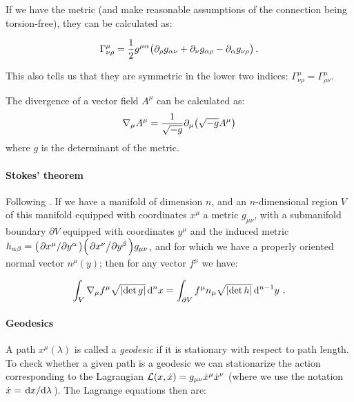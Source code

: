 \documentclass[main.tex]{subfiles}
\begin{document}
If we have the metric (and make reasonable assumptions of the connection being torsion-free), they can be calculated as:

\begin{equation}  \label{eq:christoffel-symbols-from-metric}
    \Gamma^\mu_{\nu \rho} = \frac{1}{2} g^{\mu \alpha} \qty(
    \partial_\rho g_{\alpha \nu} +
    \partial_\nu g_{\alpha \rho} -
    \partial_\alpha g_{\nu \rho}
    )\,.
\end{equation}

This also tells us that they are symmetric in the lower two indices: $\Gamma ^\mu _{\nu \rho} = \Gamma ^\mu _{\rho \nu}$.

The divergence of a vector field $A^\mu$ can be calculated as:
\begin{equation}
    \nabla_\mu A^\mu = \frac{1}{\sqrt{-g}}\partial_\mu \qty(\sqrt{-g}A^\mu) \label{eq:covariant-divergence}
\end{equation}
where $g$ is the determinant of the metric.

\paragraph{Stokes' theorem}

Following \cite[]{Unger:2016}.
If we have a manifold of dimension \(n\), and an \(n\)-dimensional region \(V\) of this manifold equipped with coordinates \(x^\mu\) a metric \(g_{\mu\nu}\), with a submanifold boundary \(\partial V\) equipped with coordinates \(y^\mu\) and the induced metric \(h_{\alpha\beta} = \qty(\pdv*{x^\mu}{y^\alpha}) \qty(\pdv*{x^\nu}{y^\beta}) g_{\mu\nu}\), and for which we have a properly oriented normal vector \(n^\mu (y)\); then for any vector \(f^\mu\) we have:

\begin{equation} \label{eq:stokes-theorem}
    \int _{V} \nabla_\mu f^\mu \sqrt{\abs{\det g}}  \dd[n]{x}  = \int _{\partial V} f^\mu  n_\mu \sqrt{\abs{\det h}} \dd[n-1]{y} \,.
\end{equation}

\paragraph{Geodesics}

A path $x^\mu(\lambda)$ is called a \emph{geodesic} if it is stationary with respect to path length.
To check whether a given path is a geodesic we can stationarize the action corresponding to the Lagrangian $\mathcal{L} (x, \Dot{x}) = g_{\mu\nu} \Dot{x}^\mu \Dot{x}^\nu$ (where we use the notation $\Dot{x} = \dv*{x}{\lambda}$). The Lagrange equations then are:
\end{document}
